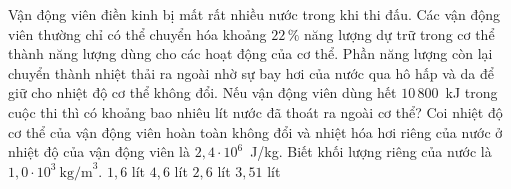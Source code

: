 	\begin{ex}%
		Vận động viên điền kinh bị mất rất nhiều nước trong khi thi đấu. Các vận động viên thường chỉ có thể chuyển hóa khoảng $22\,\%$ năng lượng dự trữ trong cơ thể thành năng lượng dùng cho các hoạt động của cơ thể. Phần năng lượng còn lại chuyển thành nhiệt thải ra ngoài nhờ sự bay hơi của nước qua hô hấp và da để giữ cho nhiệt độ cơ thể không đổi. Nếu vận động viên dùng hết $10\,800$~kJ trong cuộc thi thì có khoảng bao nhiêu lít nước đã thoát ra ngoài cơ thể? Coi nhiệt độ cơ thể của vận động viên hoàn toàn không đổi và nhiệt hóa hơi riêng của nước ở nhiệt độ của vận động viên là $2{,}4\cdot 10^6$~J/kg. Biết khối lượng riêng của nước là $1{,}0\cdot 10^3~\text{kg/m}^3$.
		\choice
		{$1{,}6$ lít}
		{$4{,}6$ lít}
		{$2{,}6$ lít}
		{\True $3{,}51$ lít}
	\end{ex}

